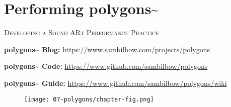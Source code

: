 \chapter{Performing polygons\textasciitilde{}}\label{sec: polygons}
\begin{flushright}
    \Large\textsc{Developing a Sound ARt Performance Practice}
\end{flushright}
\begin{SingleSpace}
    \noindent \textbf{polygons\textasciitilde{} Blog:}        \url{https://www.sambilbow.com/projects/polygons}

    \noindent \textbf{polygons\textasciitilde{} Code:}        \url{https://www.github.com/sambilbow/polygons}

    \noindent \textbf{polygons\textasciitilde{} Guide:}       \url{https://www.github.com/sambilbow/polygons/wiki}
\end{SingleSpace}

\begin{figure}
    \centering
    \texttt{[image: 07-polygons/chapter-fig.png]}
    \captionsetup{labelformat=empty}
    \caption[\autoref{sec: polygons}: \textit{polygons\textasciitilde{}} in performance at The Rosehill, Brighton, 19th February, (from \citeauthor{bilbow2022b}, \citeyear{bilbow2022b})]{}
\end{figure}

